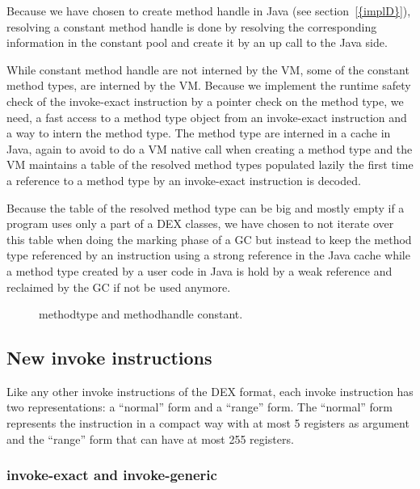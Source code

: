 \documentclass{sig-alternate}
\begin{document}
    Because we have chosen to create method handle in Java (see section~\ref{{implD}}),
    resolving a constant method handle is done by resolving the corresponding information
    in the constant pool and create it by an up call to the Java side.

    While constant method handle are not interned by the VM, some of the constant method types,
    are interned by the VM. Because we implement the runtime safety check of the invoke-exact
    instruction by a pointer check on the method type, we need, a fast access to a method type object
    from an invoke-exact instruction and a way to intern the method type.
    The method type are interned in a cache in Java, again to avoid to do a VM native call
    when creating a method type and the VM maintains  a table of the resolved method types
    populated lazily the first time a reference to a method type by an invoke-exact instruction
    is decoded.

    Because the table of the resolved method type can be big and mostly empty if a program
    uses only a part of a DEX classes, we have chosen to not iterate over this table when doing
    the marking phase of a GC but instead to keep the method type referenced by an instruction
    using a strong reference in the Java cache while a method type created by a user code in Java
    is hold by a weak reference and reclaimed by the GC if not be used anymore.    

    \begin{figure}[!h]
      \centering \resizebox{.9\linewidth}{!}{}
      \caption{methodtype and methodhandle constant.}\vspace{-1em}
      \label{MTMHldc}
    \end{figure}

  \subsection{New invoke instructions}
    Like any other invoke instructions of the DEX format,
    each invoke instruction has two representations: a ``normal'' form and a ``range'' form.
    The ``normal'' form represents the instruction in a compact way with at most 5 registers as argument 
    and the ``range'' form that can have at most 255 registers.

    \subsubsection{invoke-exact and invoke-generic}
\end{document}

